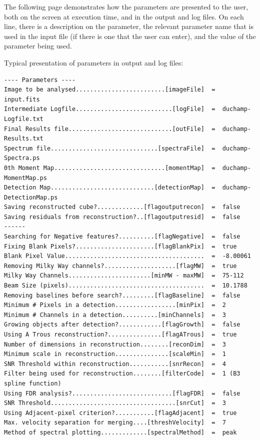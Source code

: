 \documentclass[12pt,a4paper]{article}
\begin{document}
The following page demonstrates how the parameters are presented to the 
user, both on the screen at execution time, and in the output and log 
files. On each line, there is a description on the parameter, the relevant 
parameter name that is used in the input file (if there is one that the 
user can enter), and the value of the parameter being used. 
\newpage
\begin{landscape}
Typical presentation of parameters in output and log files:  
\begin{verbatim}
---- Parameters ----
Image to be analysed.........................[imageFile]  =  input.fits
Intermediate Logfile...........................[logFile]  =  duchamp-Logfile.txt	  
Final Results file.............................[outFile]  =  duchamp-Results.txt	  
Spectrum file..............................[spectraFile]  =  duchamp-Spectra.ps	  
0th Moment Map...............................[momentMap]  =  duchamp-MomentMap.ps
Detection Map.............................[detectionMap]  =  duchamp-DetectionMap.ps
Saving reconstructed cube?.............[flagoutputrecon]  =  false
Saving residuals from reconstruction?..[flagoutputresid]  =  false
------
Searching for Negative features?..........[flagNegative]  =  false
Fixing Blank Pixels?......................[flagBlankPix]  =  true
Blank Pixel Value.......................................  =  -8.00061
Removing Milky Way channels?....................[flagMW]  =  true
Milky Way Channels.......................[minMW - maxMW]  =  75-112
Beam Size (pixels)......................................  =  10.1788
Removing baselines before search?.........[flagBaseline]  =  false
Minimum # Pixels in a detection.................[minPix]  =  2
Minimum # Channels in a detection..........[minChannels]  =  3
Growing objects after detection?............[flagGrowth]  =  false
Using A Trous reconstruction?...............[flagATrous]  =  true
Number of dimensions in reconstruction........[reconDim]  =  3
Minimum scale in reconstruction...............[scaleMin]  =  1
SNR Threshold within reconstruction...........[snrRecon]  =  4
Filter being used for reconstruction........[filterCode]  =  1 (B3 spline function)
Using FDR analysis?............................[flagFDR]  =  false
SNR Threshold...................................[snrCut]  =  3
Using Adjacent-pixel criterion?...........[flagAdjacent]  =  true
Max. velocity separation for merging....[threshVelocity]  =  7
Method of spectral plotting.............[spectralMethod]  =  peak
\end{verbatim}


\end{landscape}
\end{document}
